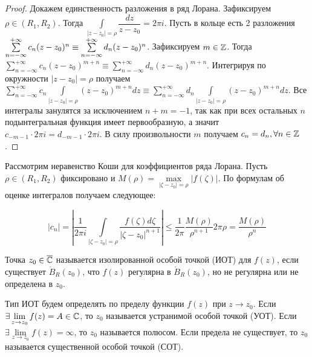 \begin{proof}
    Докажем единственность разложения в ряд Лорана. Зафиксируем \(\rho \in (R_1, R_2)\). Тогда
    \(\int\limits_{|z-z_0| = \rho} \dfrac{dz}{z-z_0} = 2 \pi i\). Пусть в кольце есть 2 разложения
    \(\sum\limits_{n = -\infty}^{+\infty} c_n (z-z_0)^n \equiv \sum\limits_{n = -\infty}^{+\infty}
    d_n (z\hm-z_0)^n\). Зафиксируем \(m \in \mathbb{Z}\). Тогда \(\sum\limits_{n = -\infty}^{+\infty} c_n
    (z-z_0)^{m+n} \equiv \sum\limits_{n = -\infty}^{+\infty} d_n (z-z_0)^{m+n}\). Интегрируя по
    окружности \(|z-z_0| = \rho\) получаем \(\sum\limits_{n = -\infty}^{+\infty} c_n
    \int\limits_{|z-z_0| = \rho} (z-z_0)^{m+n} dz \equiv \sum\limits_{n = -\infty}^{+\infty} d_n
    \int\limits_{|z-z_0| = \rho}(z-z_0)^{m+n} dz\). Все интегралы занулятся за исключением \(n+m =
    -1\), так как при всех остальных \(n\) подынтегральная функция имеет первообразную, а значит
    \(c_{-m-1} \cdot 2 \pi i = d_{-m-1} \cdot 2 \pi i\). В силу произвольности \(m\) получаем
    \(c_n = d_n, \forall n \in \mathbb{Z}\).
\end{proof}

Рассмотрим неравенство Коши для коэффициентов ряда Лорана. Пусть \(\rho \in (R_1, R_2)\) фиксировано
и \(M(\rho) = \max\limits_{|\zeta - z_0| = \rho} |f(\zeta)|\). По формулам об оценке интегралов
получаем следующее:

\begin{equation} \label{22:cauchy_unequality}
|c_n| = \left|\dfrac{1}{2 \pi i} \int\limits_{|\zeta - z_0| = \rho} \dfrac{f(\zeta) d\zeta}{|\zeta
- z_0|^{n+1}}\right| \le \dfrac{1}{2 \pi} \dfrac{M(\rho)}{\rho^{n+1}} 2\pi \rho =
\dfrac{M(\rho)}{\rho^{n}}
\end{equation}



\begin{definition}
    Точка \(z_0 \in \overline{\mathbb{C}}\) называется изолированной особой точкой (ИОТ) для \(f(z)\), если
    существует \(\mathring{B}_R(z_0)\), что \(f(z)\) регулярна в \(\mathring{B}_R(z_0)\), но не
    регулярна или не определена в \(z_0\).
\end{definition}

Тип ИОТ будем определять по пределу функции \(f(z)\) при \(z \rightarrow z_0\). Если \(\exists
\lim\limits_{z \rightarrow z_0} f(z) \hm= A \in \Co\), то \(z_0\) называется устранимой особой
точкой (УОТ). Если \(\exists \lim\limits_{z \rightarrow z_0} f(z) = \infty\), то \(z_0\) называется
полюсом. Если предела не существует, то \(z_0\) называется существенной особой точкой (СОТ).

